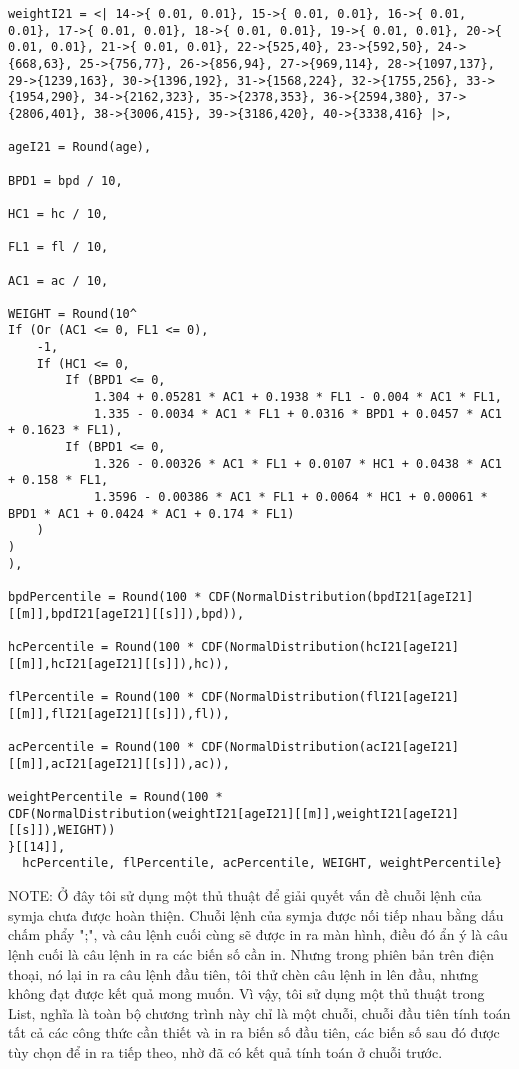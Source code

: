 \documentclass[11pt]{article}
\begin{document}
\begin{verbatim}
weightI21 = <| 14->{ 0.01, 0.01}, 15->{ 0.01, 0.01}, 16->{ 0.01, 0.01}, 17->{ 0.01, 0.01}, 18->{ 0.01, 0.01}, 19->{ 0.01, 0.01}, 20->{ 0.01, 0.01}, 21->{ 0.01, 0.01}, 22->{525,40}, 23->{592,50}, 24->{668,63}, 25->{756,77}, 26->{856,94}, 27->{969,114}, 28->{1097,137}, 29->{1239,163}, 30->{1396,192}, 31->{1568,224}, 32->{1755,256}, 33->{1954,290}, 34->{2162,323}, 35->{2378,353}, 36->{2594,380}, 37->{2806,401}, 38->{3006,415}, 39->{3186,420}, 40->{3338,416} |>,

ageI21 = Round(age),

BPD1 = bpd / 10,

HC1 = hc / 10,

FL1 = fl / 10,

AC1 = ac / 10,

WEIGHT = Round(10^
If (Or (AC1 <= 0, FL1 <= 0),
    -1,
    If (HC1 <= 0,
        If (BPD1 <= 0,
            1.304 + 0.05281 * AC1 + 0.1938 * FL1 - 0.004 * AC1 * FL1,
            1.335 - 0.0034 * AC1 * FL1 + 0.0316 * BPD1 + 0.0457 * AC1 + 0.1623 * FL1),
        If (BPD1 <= 0,
            1.326 - 0.00326 * AC1 * FL1 + 0.0107 * HC1 + 0.0438 * AC1 + 0.158 * FL1,
            1.3596 - 0.00386 * AC1 * FL1 + 0.0064 * HC1 + 0.00061 * BPD1 * AC1 + 0.0424 * AC1 + 0.174 * FL1)
    )
)
),

bpdPercentile = Round(100 * CDF(NormalDistribution(bpdI21[ageI21][[m]],bpdI21[ageI21][[s]]),bpd)),

hcPercentile = Round(100 * CDF(NormalDistribution(hcI21[ageI21][[m]],hcI21[ageI21][[s]]),hc)),

flPercentile = Round(100 * CDF(NormalDistribution(flI21[ageI21][[m]],flI21[ageI21][[s]]),fl)),

acPercentile = Round(100 * CDF(NormalDistribution(acI21[ageI21][[m]],acI21[ageI21][[s]]),ac)),

weightPercentile = Round(100 * CDF(NormalDistribution(weightI21[ageI21][[m]],weightI21[ageI21][[s]]),WEIGHT))
}[[14]],
  hcPercentile, flPercentile, acPercentile, WEIGHT, weightPercentile}
\end{verbatim}

NOTE: Ở đây tôi sử dụng một thủ thuật để giải quyết vấn đề chuỗi lệnh của symja chưa được hoàn thiện. Chuỗi lệnh của symja được nối tiếp nhau bằng dấu chấm phẩy ";", và câu lệnh cuối cùng sẽ được in ra màn hình, điều đó ẩn ý là câu lệnh cuối là câu lệnh in ra các biến số cần in. Nhưng trong phiên bản trên điện thoại, nó lại in ra câu lệnh đầu tiên, tôi thử chèn câu lệnh in lên đầu, nhưng không đạt được kết quả mong muốn. Vì vậy, tôi sử dụng một thủ thuật trong List, nghĩa là toàn bộ chương trình này chỉ là một chuỗi, chuỗi đầu tiên tính toán tất cả các công thức cần thiết và in ra biến số đầu tiên, các biến số sau đó được tùy chọn để in ra tiếp theo, nhờ đã có kết quả tính toán ở chuỗi trước.
\end{document}
